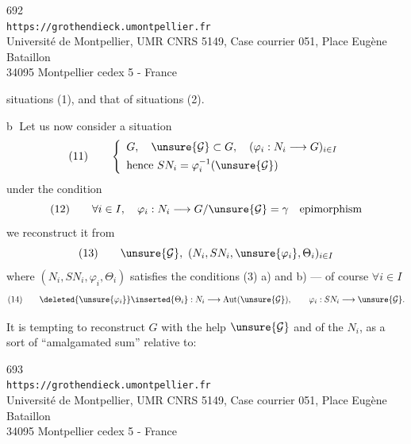 
\begin{center}
692\\
\texttt{https://grothendieck.umontpellier.fr}\\
Université de Montpellier, UMR CNRS 5149, Case courrier 051, Place Eugène Bataillon\\
34095 Montpellier cedex 5 - France
\end{center}



situations (1), and that of situations (2).

\textcircled{b}
Let us now consider a situation
\[
(11)\qquad 
\left\{\begin{array}{l}
G,\quad \unsure{\mathcal G}\subset G,\quad (\varphi_i:N_i\longrightarrow G)_{i\in I}\\[4pt]
\text{hence }SN_i=\varphi_i^{-1}(\unsure{\mathcal G})
\end{array}\right.
\]
under the condition
\[
(12)\qquad 
\forall i\in I,\quad \varphi_i:N_i\longrightarrow G/\unsure{\mathcal G}=\gamma\quad\text{epimorphism}
\]
 we reconstruct it from
\[
(13)\qquad 
\unsure{\mathcal G},\ (N_i,SN_i,\unsure{\varphi_i},\Theta_i)_{i\in I}
\]
where  $(N_i,SN_i,\varphi_i,\Theta_i)$ satisfies the conditions (3) a) and b) ---  of course $\forall i\in I$
\[
(14)\qquad 
\deleted{\unsure{\varphi_i}}\inserted{\Theta_i}:N_i\longrightarrow\operatorname{Aut}(\unsure{\mathcal G}),\qquad
\varphi_i:SN_i\longrightarrow\unsure{\mathcal G}.
\]

It is tempting to reconstruct $G$ with the help  $\unsure{\mathcal G}$ and of the $N_i$, as a sort of ``amalgamated sum'' relative to:

\noindent {}\quad
{}


\begin{center}
693\\
\texttt{https://grothendieck.umontpellier.fr}\\
Université de Montpellier, UMR CNRS 5149, Case courrier 051, Place Eugène Bataillon\\
34095 Montpellier cedex 5 - France
\end{center}


